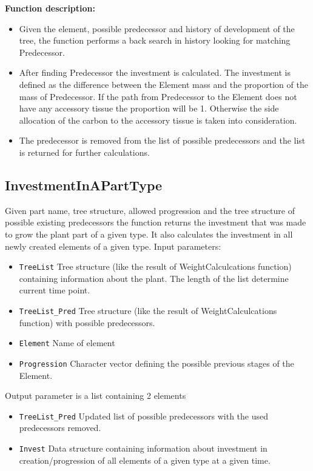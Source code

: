 \documentclass[10pt]{book} %
\begin{document}
\noindent \textbf{Function description:}
\begin{itemize}
\item Given the element, possible predecessor and history of development of the tree, the function performs a back search in history looking for matching Predecessor.
\item After finding Predecessor the investment is calculated. The investment is defined as the difference between the Element mass and the proportion of the mass of Predecessor. If the path from Predecessor to the Element does not have any accessory tissue the proportion will be 1. Otherwise the side allocation of the carbon to the accessory tissue is taken into consideration.
\item The predecessor is removed from the list of possible predecessors and the list is returned for further calculations.
\end{itemize}


\subsection*{InvestmentInAPartType}
Given part name, tree structure, allowed progression and the tree structure of possible existing predecessors the function returns the investment that was made to grow the plant part of a given type. It also calculates the investment in all newly created elements of a given type.
Input parameters:
\begin{itemize}
\item \texttt{TreeList}  Tree structure (like the result of WeightCalculcations function) containing information about the plant. The length of the list determine current time point.
\item \texttt{TreeList\_Pred}  Tree structure (like the result of WeightCalculcations function) with possible predecessors.
\item \texttt{Element}  Name of element
\item \texttt{Progression} Character vector defining the possible previous stages of the Element.
\end{itemize}
Output parameter is a list containing 2 elements
\begin{itemize}
\item \texttt{TreeList\_Pred}  Updated list of possible predecessors with the used predecessors removed.
\item \texttt{Invest} Data structure containing information about investment in creation/progression of all elements of a given type at a given time.
\end{itemize}
\end{document}
